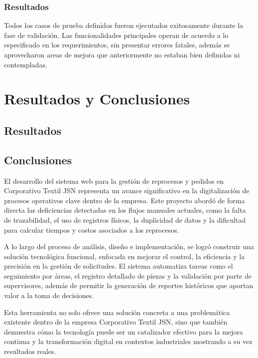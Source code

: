 \documentclass[12pt,letterpaper,spanish]{report}
\begin{document}
\subsection{Resultados}
Todos los casos de prueba definidos fueron ejecutados exitosamente durante la fase de validaci\'on. Las funcionalidades principales operan de acuerdo a lo especificado en los requerimientos, sin presentar errores fatales, además se aprovecharon areas de mejora que anteriormente no estaban bien definidas ni contempladas.






\chapter{Resultados y Conclusiones}
\newpage

\section{Resultados}


\section{Conclusiones}

El desarrollo del sistema web para la gestión de reprocesos y pedidos en Corporativo Textil JSN representa un avance significativo en la digitalización de procesos operativos clave dentro de la empresa. Este proyecto abordó de forma directa las deficiencias detectadas en los flujos manuales actuales, como la falta de trazabilidad, el uso de registros físicos, la duplicidad de datos y la dificultad para calcular tiempos y costos asociados a los reprocesos.

A lo largo del proceso de análisis, diseño e implementación, se logró construir una solución tecnológica funcional, enfocada en mejorar el control, la eficiencia y la precisión en la gestión de solicitudes. El sistema automatiza tareas como el seguimiento por áreas, el registro detallado de piezas y la validación por parte de supervisores, además de permitir la generación de reportes históricos que aportan valor a la toma de decisiones.

Esta herramienta no solo ofrece una solución concreta a una problemática existente dentro de la empresa Corporativo Textil JSN, sino que también demuestra cómo la tecnología puede ser un catalizador efectivo para la mejora continua y la transformación digital en contextos industriales mostrando a su vez resultados reales.
\end{document}
